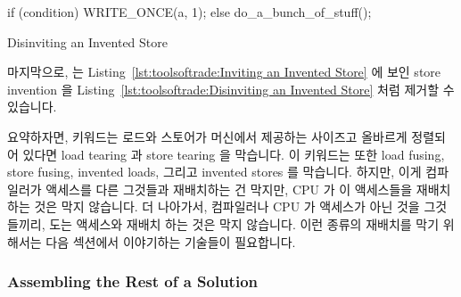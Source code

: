 {{{{\begin{listing}[tbp]
\begin{linelabel}
\begin{VerbatimL}[commandchars=\\\{\}]
if (condition)
	WRITE_ONCE(a, 1);
else
	do_a_bunch_of_stuff();
\end{VerbatimL}
\end{linelabel}
\caption{Disinviting an Invented Store}
\label{lst:toolsoftrade:Disinviting an Invented Store}
\end{listing}

마지막으로,  는
Listing~\ref{lst:toolsoftrade:Inviting an Invented Store}
에 보인 store invention 을
Listing~\ref{lst:toolsoftrade:Disinviting an Invented Store}
처럼 제거할 수 있습니다.

요약하자면,  키워드는 로드와 스토어가 머신에서 제공하는 사이즈고
올바르게 정렬되어 있다면 load tearing 과 store tearing 을 막습니다.
이 키워드는 또한 load fusing, store fusing, invented loads, 그리고 invented
stores 를 막습니다.
하지만, 이게 컴파일러가  액세스를 다른 그것들과 재배치하는 건
막지만, CPU 가 이 액세스들을 재배치 하는 것은 막지 않습니다.
더 나아가서, 컴파일러나 CPU 가  액세스가 아닌 것을 그것들끼리,
도는  액세스와 재배치 하는 것은 막지 않습니다.
이런 종류의 재배치를 막기 위해서는 다음 섹션에서 이야기하는 기술들이
필요합니다.

\subsubsection{Assembling the Rest of a Solution}
\label{sec:toolsoftrade:Assembling the Rest of a Solution}

}}}}
